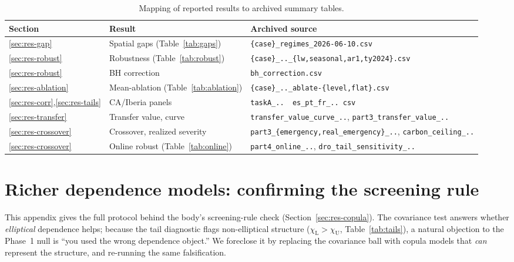 \documentclass[12pt]{article}
\newcommand{\chiU}{\chi_{\mathrm{U}}}
\newcommand{\chiL}{\chi_{\mathrm{L}}}
\begin{document}
\begin{table}[h]
\centering\small
\caption{Mapping of reported results to archived summary tables.}
\label{tab:snapmap}
\begin{tabular}{ll p{}}
\toprule
Section & Result & Archived source\\
\midrule
\ref{sec:res-gap} & Spatial gaps (Table~\ref{tab:gaps}) &
\texttt{\{case\}\_regimes\_2026-06-10.csv}\\
\ref{sec:res-robust} & Robustness (Table~\ref{tab:robust}) &
\texttt{\{case\}\_..\_\{lw,seasonal,ar1,ty2024\}.csv}\\
\ref{sec:res-robust} & BH correction & \texttt{bh\_correction.csv}\\
\ref{sec:res-ablation} & Mean-ablation (Table~\ref{tab:ablation}) &
\texttt{\{case\}\_..\_ablate-\{level,flat\}.csv}\\
\ref{sec:res-corr},\ref{sec:res-tails} & CA/Iberia panels &
\texttt{taskA\_..\, es\_pt\_fr\_..\,csv}\\
\ref{sec:res-transfer} & Transfer value, curve &
\texttt{transfer\_value\_curve\_..}, \texttt{part3\_transfer\_value\_..}\\
\ref{sec:res-crossover} & Crossover, realized severity &
\texttt{part3\_\{emergency,real\_emergency\}\_..}, \texttt{carbon\_ceiling\_..}\\
\ref{sec:res-crossover} & Online robust (Table~\ref{tab:online}) &
\texttt{part4\_online\_..}, \texttt{dro\_tail\_sensitivity\_..}\\
\bottomrule
\end{tabular}
\end{table}

\section{Richer dependence models: confirming the screening rule}\label{app:copula}
This appendix gives the full protocol behind the body's screening-rule check
(Section~\ref{sec:res-copula}). The covariance test answers whether \emph{elliptical}
dependence helps; because the tail diagnostic flags non-elliptical structure
($\chiL>\chiU$, Table~\ref{tab:tails}), a natural objection to the Phase~1 null is
``you used the wrong dependence object.'' We foreclose it by replacing the covariance
ball with copula models that \emph{can} represent the structure, and re-running the
same falsification.
\end{document}
